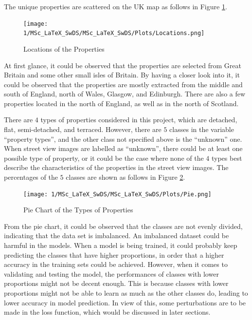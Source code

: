 \documentclass[11pt,twoside]{article}
\numberwithin{Theorem}{section}
\numberwithin{Definition}{section}
\numberwithin{Lemma}{section}
\numberwithin{Algorithm}{section}
\numberwithin{equation}{section}
\begin{document}
The unique properties are scattered on the UK map as follows in Figure \ref{fig:locations}. 


\begin{figure}[h]
\centering
\texttt{[image: 1/MSc\_LaTeX\_SwDS/MSc\_LaTeX\_SwDS/Plots/Locations.png]}
\caption{Locations of the Properties}
\label{fig:locations}
\end{figure}

At first glance, it could be observed that the properties are selected from Great Britain and some other small isles of Britain. By having a closer look into it, it could be observed that the properties are mostly extracted from the middle and south of England, north of Wales, Glasgow, and Edinburgh. There are also a few properties located in the north of England, as well as in the north of Scotland.

There are $4$ types of properties considered in this project, which are detached, flat, semi-detached, and terraced. However, there are $5$ classes in the variable “property types”, and the other class not specified above is the “unknown” one. When street view images are labelled as “unknown”, there could be at least one possible type of property, or it could be the case where none of the $4$ types best describe the characteristics of the properties in the street view images. The percentages of the $5$ classes are shown as follows in Figure \ref{fig:pie}. 

\begin{figure}[h]
\centering
\texttt{[image: 1/MSc\_LaTeX\_SwDS/MSc\_LaTeX\_SwDS/Plots/Pie.png]}
\caption{Pie Chart of the Types of Properties}
\label{fig:pie}
\end{figure}

From the pie chart, it could be observed that the classes are not evenly divided, indicating that the data set is imbalanced. An imbalanced dataset could be harmful in the models. When a model is being trained, it could probably keep predicting the classes that have higher proportions, in order that a higher accuracy in the training sets could be achieved. However, when it comes to validating and testing the model, the performances of classes with lower proportions might not be decent enough. This is because classes with lower proportions might not be able to learn as much as the other classes do, leading to lower accuracy in model prediction. In view of this, some perturbations are to be made in the loss function, which would be discussed in later sections.
\end{document}
